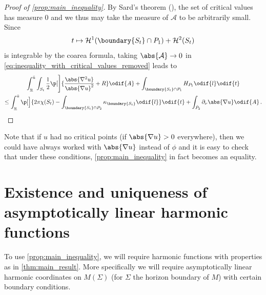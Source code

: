 \documentclass[titlepage,numbers=noenddot,oneside,%
cleardoublepage=empty,paper=a4,fontsize=11pt,%
english,%
]{scrartcl}
\newcommand*{\mathfullstop}{\,.}
\begin{document}
{\begin{proof}[Proof of \cref{prop:main_inequality}]
    By Sard's theorem (\cite{sardMeasureCriticalValues1942}), the set of critical values has measure \( 0 \) and we thus may take the measure of \( \mathcal{A} \) to be arbitrarily small. Since
    \begin{equation*}
        t\mapsto \mathcal{H}^1(\boundary{S_t}\cap P_1)+\mathcal{H}^2(S_t)
    \end{equation*}
    is integrable by the coarea formula, taking \( \abs{\mathcal{A}}\to 0 \) in \cref{eq:inequality_with_critical_values_removed} leads to
    \begin{multline*}
        \int_{\minu}^{\maxu} \int_{S_t} \frac{1}{2}\p[\Bigg]{\frac{\abs{\nabla^2 u}}{\abs{\nabla u}^2}+R }\odif{A}+\int_{\boundary{S_t}\cap P_1}H_{P_1}\odif{l}\odif{t}\\
        \leq\int_{\minu}^{\maxu}\p[\Big]{2\pi \chi(S_t)-\int _{\boundary{S_t} \cap P_2}\kappa_{\boundary{S_t}}\odif{l}}\odif{t}+ \int_{\tilde{P}_2}\partial_{\nu} \abs{\nabla u}\odif{A}\mathfullstop
    \end{multline*} 
\end{proof}}
\begin{remark}\label{rem:no_critical_points_then_main_inequality_is_equality}
    Note that if \( u \) had no critical points (\ie if \( \abs{\nabla u}>0 \) everywhere), then we could have always worked with \( \abs{\nabla u} \) instead of \( \phi \) and it is easy to check that under these conditions, \cref{prop:main_inequality} in fact becomes an equality.
\end{remark}
\section{Existence and uniqueness of asymptotically linear harmonic functions}\label{sec:existence_and_uniqueness}
To use \cref{prop:main_inequality}, we will require harmonic functions with properties as in \cref{thm:main_result}. More specifically we will require asymptotically linear harmonic coordinates on \( M(\Sigma) \) (for \( \Sigma \) the horizon boundary of \( M \)) with certain boundary conditions.
\end{document}
